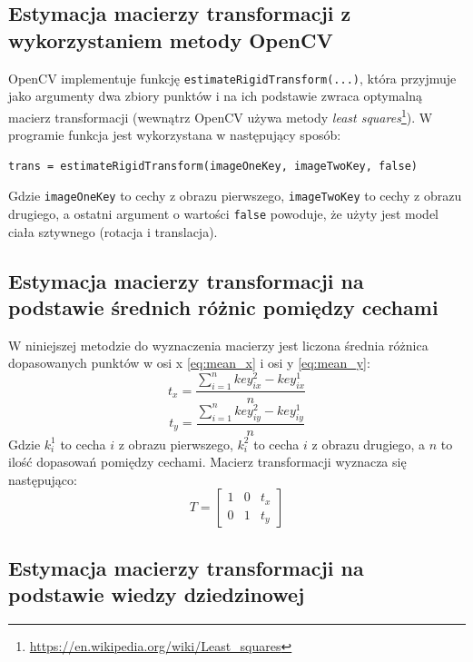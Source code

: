 \subsection{Estymacja macierzy transformacji z wykorzystaniem metody OpenCV}
\label{sec:proponowane_algorytmy:rigid}

OpenCV implementuje funkcję \texttt{estimateRigidTransform(...)}, która przyjmuje jako argumenty dwa zbiory punktów i na ich podstawie zwraca optymalną macierz transformacji (wewnątrz OpenCV używa metody \textit{least squares}\footnote{\url{https://en.wikipedia.org/wiki/Least_squares}}). W programie funkcja jest wykorzystana w następujący sposób:

\begin{verbatim}
trans = estimateRigidTransform(imageOneKey, imageTwoKey, false)
\end{verbatim}

Gdzie \texttt{imageOneKey} to cechy z obrazu pierwszego, \texttt{imageTwoKey} to cechy z obrazu drugiego, a ostatni argument o wartości \texttt{false} powoduje, że użyty jest model ciała sztywnego (rotacja i translacja).

\subsection{Estymacja macierzy transformacji na podstawie średnich różnic pomiędzy cechami}
\label{sec:proponowane_algorytmy:srednie_roznice}

W niniejszej metodzie do wyznaczenia macierzy jest liczona średnia różnica dopasowanych punktów w osi x \ref{eq:mean_x} i osi y \ref{eq:mean_y}:
\begin{equation}
t_x = \frac{\sum_{i=1}^{n} key_{ix}^{2} - key_{ix}^{1}}{n}
\label{eq:mean_x}
\end{equation}
\begin{equation}
t_y = \frac{\sum_{i=1}^{n} key_{iy}^{2} - key_{iy}^{1}}{n}
\label{eq:mean_y}
\end{equation}
Gdzie $k_i^{1}$ to cecha $i$ z obrazu pierwszego, $k_i^{2}$ to cecha $i$ z obrazu drugiego, a $n$ to ilość dopasowań pomiędzy cechami. Macierz transformacji wyznacza się następująco:
\begin{equation}
T = \begin{bmatrix}
  1 & 0 & t_x \\
  0 & 1 & t_y
\end{bmatrix}
\end{equation}
\subsection{Estymacja macierzy transformacji na podstawie wiedzy dziedzinowej}

